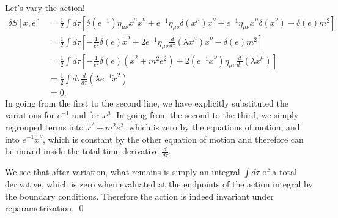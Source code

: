 Let's vary the action!
\begin{align*}
    \delta S[x,e]&= \frac{1}{2}\int d\tau \left[\delta(e^{-1}) \eta_{\mu\nu} \dot x^\mu \dot x^\nu +e^{-1} \eta_{\mu\nu} \delta(\dot x^\mu) \dot x^\nu +e^{-1} \eta_{\mu\nu} \dot x^\mu \delta(\dot x^\nu) - \delta(e) m^2 \right]\\
    &= \frac{1}{2} \int d\tau \left[ -\frac{1}{e^2} \delta(e) \dot x^2 +2 e^{-1} \eta_{\mu\nu} \frac{d}{d\tau} (\lambda \dot x^\mu) \dot x^\nu  -\delta(e) m^2\right]\\
    &=\frac{1}{2} \int d\tau \left[ -\frac{1}{e^2} \delta(e) (\dot x^2+m^2 e^2) +2 (e^{-1}\dot x^\nu) \eta_{\mu\nu} \frac{d}{d\tau} (\lambda \dot x^\mu)  \right]\\
    &=\frac{1}{2} \int d\tau \frac{d}{d\tau} (\lambda e^{-1} \dot x^2)\\
    &=0.
\end{align*}
In going from the first to the second line, we have explicitly substituted the variations for $e^{-1}$ and for $\dot x^\mu$. In going from the second to the third, we simply regrouped terms into $\dot x^2+m^2 e^2$, which is zero by the equations of motion, and into $e^{-1}\dot x^\nu$, which is constant by the other equation of motion and therefore can be moved inside the total time derivative $\frac{d}{d\tau}$. 

We see that after variation, what remains is simply an integral $\int d\tau$ of a total derivative, which is zero when evaluated at the endpoints of the action integral by the boundary conditions. Therefore the action is indeed invariant under reparametrization. \qed